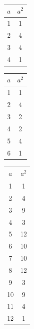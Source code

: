 \begin{minipage}{\textwidth}
	\begin{minipage}[h]{0.3\textwidth}
		\centering
		\begin{tabular}{ | c | c |}
			\hline
			$a$  & $a^2$  \\ \hline
			1 & 1  \\ \hline
			2 & 4  \\ \hline 
			3 & 4 \\ \hline
			4 & 1 \\ \hline 
		\end{tabular}  
			\captionsetup{type=table,hypcap=false}\caption{$a^2 \bmod 5$}
		\label{tab:p_eq_5} 
	\end{minipage}
	\begin{minipage}[h]{0.3\textwidth}
		\centering
	\begin{tabular}{ | c | c |}
		\hline
		$a$  & $a^2$\\ \hline
		1 & 1  \\ \hline
		2 & 4 \\ \hline
		3 & 2  \\ \hline
		4 & 2  \\ \hline
		5 & 4  \\ \hline
		6 & 1  \\ \hline
	\end{tabular}  
	\captionsetup{type=table,hypcap=false}\caption{$a^2 \bmod 7$}
\label{tab:p_eq_7} 
	\end{minipage}
	\begin{minipage}[h]{0.3\textwidth}
		\centering
	\begin{tabular}{ | c | c |}
		\hline
		$a$  & $a^2$ \\ \hline
		1 & 1   \\ \hline
		2 & 4  \\ \hline
		3 & 9  \\ \hline
		4 & 3  \\ \hline
		5 & 12 \\ \hline
		6 & 10 \\ \hline
		7 & 10  \\ \hline
		8 & 12 \\ \hline
		9 &  3 \\ \hline
		10 & 9  \\ \hline
		11 & 4 \\ \hline
		12 & 1 \\ \hline
	\end{tabular}
  \captionsetup{type=table,hypcap=false}\caption{$a^2 \bmod 13$}
  \label{tab:p_eq_13} 
	\end{minipage}
\end{minipage}
 
